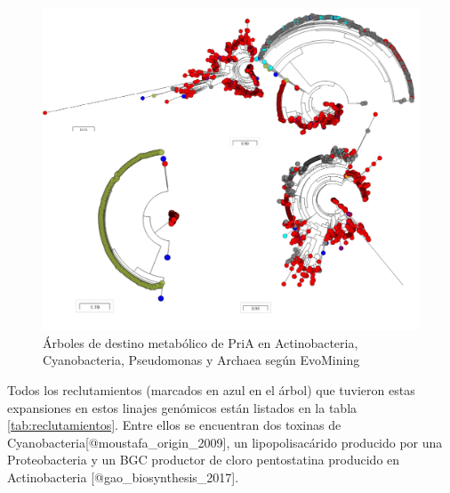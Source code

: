\documentclass[]{article}
\begin{document}
\begin{figure}[h!tbp]
\centering
\includegraphics[angle = 0,scale = 0.8]{chapter4/PriAEvoMining.pdf}
\caption[Árboles de destino metabólico de PriA en Actinobacteria, Cyanobacteria, {Pseudomonas} y Archaea según EvoMining]{\footnotesize{Árboles de destino metabólico de PriA en Actinobacteria, Cyanobacteria, {Pseudomonas} y Archaea según EvoMining}}
\label{fig:PriATrees}
\end{figure}

Todos los reclutamientos (marcados en azul en el árbol) que tuvieron
estas expansiones en estos linajes genómicos están listados en la tabla
\autoref{tab:reclutamientos}. Entre ellos se encuentran dos toxinas de
Cyanobacteria{[}@moustafa\_origin\_2009{]}, un lipopolisacárido
producido por una Proteobacteria y un BGC productor de cloro
pentostatina producido en Actinobacteria {[}@gao\_biosynthesis\_2017{]}.
\end{document}
